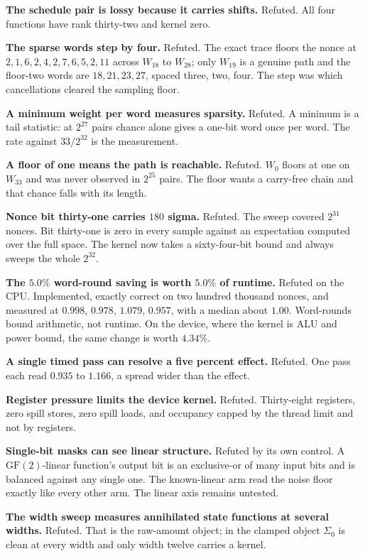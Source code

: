 \textbf{The schedule pair is lossy because it carries shifts.} Refuted. All four functions have rank thirty-two and kernel zero.

\textbf{The sparse words step by four.} Refuted. The exact trace floors the nonce at \(2, 1, 6, 2, 4, 2, 7, 6, 5, 2, 11\) across \(W_{18}\) to \(W_{28}\); only \(W_{19}\) is a genuine path and the floor-two words are \(18, 21, 23, 27\), spaced three, two, four. The step was which cancellations cleared the sampling floor.

\textbf{A minimum weight per word measures sparsity.} Refuted. A minimum is a tail statistic: at \(2^{27}\) pairs chance alone gives a one-bit word once per word. The rate against \(33/2^{32}\) is the measurement.

\textbf{A floor of one means the path is reachable.} Refuted. \(W_0\) floors at one on \(W_{33}\) and was never observed in \(2^{25}\) pairs. The floor wants a carry-free chain and that chance falls with its length.

\textbf{Nonce bit thirty-one carries \(180\) sigma.} Refuted. The sweep covered \(2^{31}\) nonces. Bit thirty-one is zero in every sample against an expectation computed over the full space. The kernel now takes a sixty-four-bit bound and always sweeps the whole \(2^{32}\).

\textbf{The \(5.0\%\) word-round saving is worth \(5.0\%\) of runtime.} Refuted on the CPU. Implemented, exactly correct on two hundred thousand nonces, and measured at \(0.998\), \(0.978\), \(1.079\), \(0.957\), with a median about \(1.00\). Word-rounds bound arithmetic, not runtime. On the device, where the kernel is ALU and power bound, the same change is worth \(4.34\%\).

\textbf{A single timed pass can resolve a five percent effect.} Refuted. One pass each read \(0.935\) to \(1.166\), a spread wider than the effect.

\textbf{Register pressure limits the device kernel.} Refuted. Thirty-eight registers, zero spill stores, zero spill loads, and occupancy capped by the thread limit and not by registers.

\textbf{Single-bit masks can see linear structure.} Refuted by its own control. A \(\mathrm{GF}(2)\)-linear function's output bit is an exclusive-or of many input bits and is balanced against any single one. The known-linear arm read the noise floor exactly like every other arm. The linear axis remains untested.

\textbf{The width sweep measures annihilated state functions at several widths.} Refuted. That is the raw-amount object; in the clamped object \(\Sigma_0\) is clean at every width and only width twelve carries a kernel.

